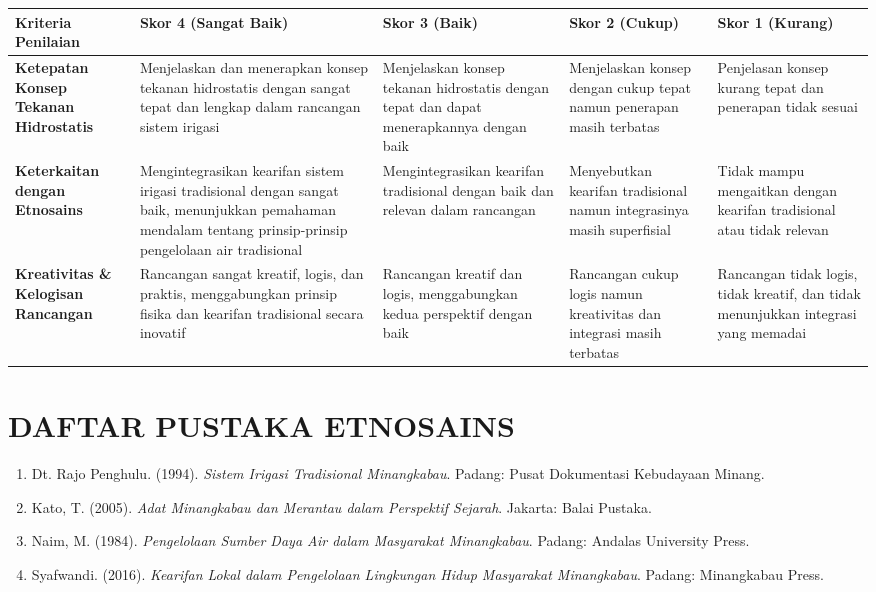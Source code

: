 \documentclass[12pt,a4paper]{article}
\begin{document}
\begin{longtable}{|p{3cm}|p{3cm}|p{3cm}|p{3cm}|p{3cm}|}
\hline
\textbf{Kriteria Penilaian} & \textbf{Skor 4 (Sangat Baik)} & \textbf{Skor 3 (Baik)} & \textbf{Skor 2 (Cukup)} & \textbf{Skor 1 (Kurang)} \\
\hline
\textbf{Ketepatan Konsep Tekanan Hidrostatis} & Menjelaskan dan menerapkan konsep tekanan hidrostatis dengan sangat tepat dan lengkap dalam rancangan sistem irigasi & Menjelaskan konsep tekanan hidrostatis dengan tepat dan dapat menerapkannya dengan baik & Menjelaskan konsep dengan cukup tepat namun penerapan masih terbatas & Penjelasan konsep kurang tepat dan penerapan tidak sesuai \\
\hline
\textbf{Keterkaitan dengan Etnosains} & Mengintegrasikan kearifan sistem irigasi tradisional dengan sangat baik, menunjukkan pemahaman mendalam tentang prinsip-prinsip pengelolaan air tradisional & Mengintegrasikan kearifan tradisional dengan baik dan relevan dalam rancangan & Menyebutkan kearifan tradisional namun integrasinya masih superfisial & Tidak mampu mengaitkan dengan kearifan tradisional atau tidak relevan \\
\hline
\textbf{Kreativitas \& Kelogisan Rancangan} & Rancangan sangat kreatif, logis, dan praktis, menggabungkan prinsip fisika dan kearifan tradisional secara inovatif & Rancangan kreatif dan logis, menggabungkan kedua perspektif dengan baik & Rancangan cukup logis namun kreativitas dan integrasi masih terbatas & Rancangan tidak logis, tidak kreatif, dan tidak menunjukkan integrasi yang memadai \\
\hline
\end{longtable}

\section{DAFTAR PUSTAKA ETNOSAINS}

\begin{enumerate}
\item Dt. Rajo Penghulu. (1994). \textit{Sistem Irigasi Tradisional Minangkabau}. Padang: Pusat Dokumentasi Kebudayaan Minang.
\item Kato, T. (2005). \textit{Adat Minangkabau dan Merantau dalam Perspektif Sejarah}. Jakarta: Balai Pustaka.
\item Naim, M. (1984). \textit{Pengelolaan Sumber Daya Air dalam Masyarakat Minangkabau}. Padang: Andalas University Press.
\item Syafwandi. (2016). \textit{Kearifan Lokal dalam Pengelolaan Lingkungan Hidup Masyarakat Minangkabau}. Padang: Minangkabau Press.
\end{enumerate}
\end{document}
